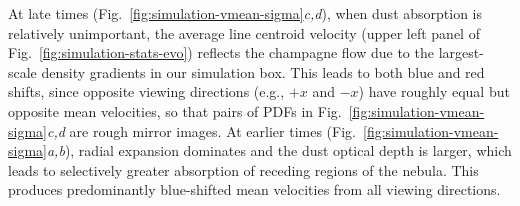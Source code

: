 \documentclass[useAMS,usenatbib]{mn2e}
\begin{document}
At late times (Fig.~\ref{fig:simulation-vmean-sigma}\textit{c,d}),
when dust absorption is relatively unimportant, the average line
centroid velocity (upper left panel of
Fig.~\ref{fig:simulation-stats-evo}) reflects the champagne flow due
to the largest-scale density gradients in our simulation box.  This
leads to both blue and red shifts, since opposite viewing directions
(e.g., \(+x\) and \(-x\)) have roughly equal but opposite mean
velocities, so that pairs of PDFs in
Fig.~\ref{fig:simulation-vmean-sigma}\textit{c,d} are rough mirror
images.  At earlier times
(Fig.~\ref{fig:simulation-vmean-sigma}\textit{a,b}), radial expansion
dominates and the dust optical depth is larger, which leads to
selectively greater absorption of receding regions of the nebula.
This produces predominantly blue-shifted mean velocities from all
viewing directions.



\end{document}

